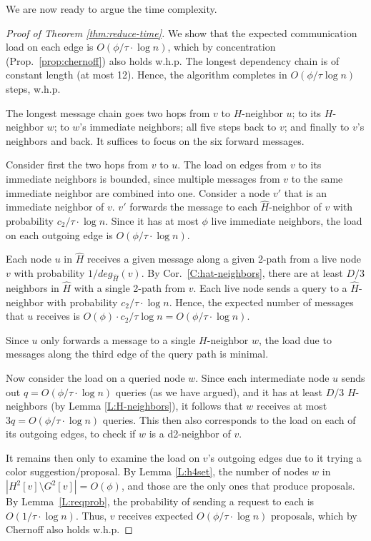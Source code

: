 \documentclass[12pt,a4]{article}
\begin{document}
We are now ready to argue the time complexity.

\begin{proof}[Proof of Theorem \ref{thm:reduce-time}]
We show that the expected communication load on each edge is $O(\phi/\tau \cdot \log n)$, 
which by concentration (Prop.~\ref{prop:chernoff}) also holds w.h.p. 
The longest dependency chain is of constant length (at most 12).
Hence, the algorithm completes in $O(\phi/\tau \log n)$ steps, w.h.p.

The longest message chain goes two hops from $v$ to $H$-neighbor $u$; to its $H$-neighbor $w$; to $w$'s immediate neighbors; all five steps back to $v$; and finally to $v$'s neighbors and back.
It suffices to focus on the six forward messages. 

Consider first the two hops from $v$ to $u$.
The load on edges from $v$ to its immediate neighbors is bounded, since multiple messages from $v$ to the same immediate neighbor are combined into one. 
Consider a node $v'$ that is an immediate neighbor of $v$. $v'$ forwards the message to each $\hat{H}$-neighbor of $v$ with probability $c_2/\tau \cdot \log n$. Since it has at most $\phi$ live immediate neighbors, the load on each outgoing edge is $O(\phi/\tau \cdot \log n)$. 

Each node $u$ in $\hat{H}$ receives a given message along a given 2-path from a live node $v$ with probability $1/deg_{\hat{H}}(v)$. By Cor.~\ref{C:hat-neighbors}, there are at least $D/3$ neighbors in $\hat{H}$ with a single 2-path from $v$.
Each live node sends a query to a $\hat{H}$-neighbor with probability $c_2/\tau \cdot \log n$. Hence, the expected number of messages that $u$ receives is $O(\phi) \cdot c_2/\tau \log n = O(\phi/\tau \cdot \log n)$.
%

Since $u$ only forwards a message to a single $H$-neighbor $w$, the load due to messages along the third edge of the query path is minimal. 


Now consider the load on a queried node $w$.
Since each intermediate node $u$ sends out $q = O(\phi/\tau \cdot \log n)$ queries (as we have argued), and it has at least $D/3$ $H$-neighbors (by Lemma \ref{L:H-neighbors}), it follows that $w$ receives at most $3q = O(\phi/\tau \cdot \log n)$ queries.
This then also corresponds to the load on each of its outgoing edges, to check if $w$ is a d2-neighbor of $v$. 

It remains then only to examine the load on $v$'s outgoing edges due to it trying a color suggestion/proposal. 
 By Lemma \ref{L:h4set}, the number of nodes $w$ in $|H^2[v] \setminus G^2[v]| = O(\phi)$, and those are the only ones that produce proposals. By Lemma~\ref{L:reqprob}, the probability of sending a request to each is $O(1/\tau \cdot \log n)$.
 Thus, $v$ receives expected $O(\phi/\tau \cdot \log n)$ proposals, which by Chernoff also holds w.h.p.
\end{proof}





\end{document}
